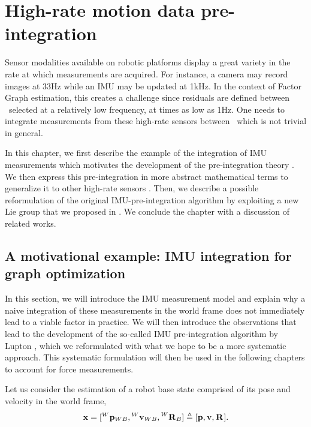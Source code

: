 \chapter{High-rate motion data pre-integration}
\label{chp:pre-integration}
\minitoc
\bigskip


Sensor modalities available on robotic platforms display a great variety in the rate at which measurements are acquired. For instance, 
a camera may record images at 33Hz while an IMU may be updated at 1kHz. In the context of Factor Graph estimation, this creates a challenge since residuals
are defined between \keyframes\ selected at a relatively low frequency, at times as low as 1Hz. One needs to integrate measurements from these high-rate sensors between \keyframes\,
which is not trivial in general.

In this chapter, we first describe the example of the integration of IMU measurements which motivates the development of the pre-integration theory \cite{lupton-09,forster2017-TRO}.
We then express this pre-integration in more abstract mathematical terms to generalize it to other high-rate sensors \cite{atchuthan-18-thesis}. 
Then, we describe a possible reformulation of the original IMU-pre-integration algorithm \cite{forster2017-TRO} by exploiting a new Lie group that we 
proposed in \cite{fourmy2019absolute}. We conclude the chapter with a discussion of related works.

  
\section{A motivational example: IMU integration for graph optimization}
\label{sec:imu_preint_motivation}

In this section, we will introduce the IMU measurement model and explain why a naive integration of these measurements in the world frame does not immediately
lead to a viable factor in practice. We will then introduce the observations that lead to the development of the so-called IMU pre-integration algorithm by Lupton \cite{lupton-09},
which we reformulated with what we hope to be a more systematic approach. This systematic formulation will then be used 
in the following chapters to account for force measurements.

Let us consider the estimation of a robot base state comprised of its pose and velocity in the world frame,
%
\begin{equation}
    {\bf x} = [\prescript{W}{}{{\bf p}}_{WB}, \prescript{W}{}{{\bf v}}_{WB}, \prescript{W}{}{{\bf R}}_{B}]
    \triangleq 
    [{\bf p}, {\bf v}, \prescript{}{}{{\bf R}}_{}].
\end{equation}

